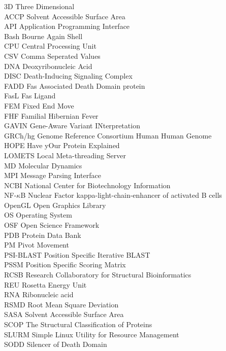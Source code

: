 3D Three Dimensional\\
ACCP Solvent Accessible Surface Area\\
API Application Programming Interface\\
Bash Bourne Again Shell\\
CPU Central Processing Unit\\
CSV Comma Seperated Values\\
DNA Deoxyribonucleic Acid\\
DISC Death-Inducing Signaling Complex\\
FADD Fas Associated Death Domain protein\\
FasL Fas Ligand\\
FEM Fixed End Move\\
FHF Familial Hibernian Fever\\
GAVIN Gene-Aware Variant INterpretation\\
GRCh/hg Genome Reference Consortium Human Human Genome\\
HOPE Have yOur Protein Explained\\
LOMETS Local Meta-threading Server\\
MD	Molecular Dynamics\\
MPI Message Parsing Interface\\
NCBI National Center for Biotechnology Information\\
NF-$\kappa$B Nuclear Factor kappa-light-chain-enhancer of activated B cells\\
OpenGL Open Graphics Library\\
OS Operating System\\
OSF Open Science Framework\\
PDB Protein Data Bank\\
PM Pivot Movement\\
PSI-BLAST Position Specific Iterative BLAST\\
PSSM Position Specific Scoring Matrix\\
RCSB Research Collaboratory for Structural Bioinformatics\\
REU Rosetta Energy Unit\\
RNA Ribonucleic acid\\
RSMD Root Mean Square Deviation\\
SASA Solvent Accessible Surface Area\\
SCOP The Structural Classification of Proteins\\
SLURM Simple Linux Utility for Resource Management\\
SODD Silencer of Death Domain\\
